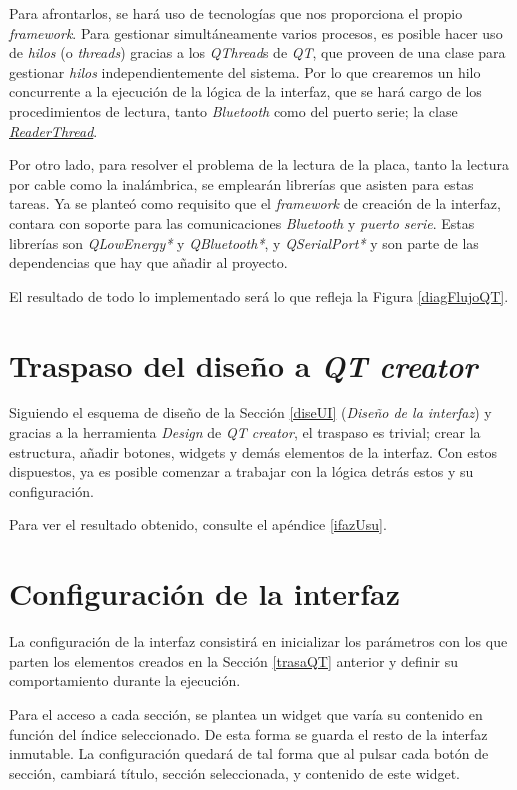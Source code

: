Para afrontarlos, se hará uso de tecnologías que nos proporciona el propio
\textit{framework}. Para gestionar simultáneamente varios procesos, es
posible hacer uso de \textit{hilos} (o \textit{threads}) gracias a los
\textit{QThread}s de \textit{QT}, que proveen de una clase para gestionar
\textit{hilos} independientemente del sistema. Por lo que crearemos un
hilo concurrente a la ejecución de la lógica de la interfaz, que se hará
cargo de los procedimientos de lectura, tanto \textit{Bluetooth} como del
puerto serie; la clase
\href{https://github.com/AntonioPriego/SmartPen/blob/main/SmartPenUI/readerthread.cpp}{\textit{ReaderThread}}.

Por otro lado, para resolver el problema de la lectura de la placa,
tanto la lectura por cable como la inalámbrica, se emplearán
librerías que asisten para estas tareas. Ya se planteó como requisito
que el \textit{framework} de creación de la interfaz, contara con
soporte para las comunicaciones \textit{Bluetooth} y
\textit{puerto serie}. Estas librerías son \textit{QLowEnergy*} y
\textit{QBluetooth*}, y \textit{QSerialPort*} y son parte de las dependencias
que hay que añadir al proyecto.

El resultado de todo lo implementado será lo que refleja la Figura \ref{diagFlujoQT}.

\section{Traspaso del diseño a \textit{QT creator}\label{trasaQT}}
Siguiendo el esquema de diseño de la Sección \ref{diseUI} (\textit{Diseño de la interfaz})
y gracias a la herramienta \textit{Design} de \textit{QT creator},
el traspaso es trivial; crear la estructura, añadir botones, widgets
y demás elementos de la interfaz. Con estos dispuestos, ya es posible
comenzar a trabajar con la lógica detrás estos y su configuración.

Para ver el resultado obtenido, consulte el apéndice \ref{ifazUsu}.

\section{Configuración de la interfaz}
La configuración de la interfaz consistirá en inicializar los parámetros
con los que parten los elementos creados en la Sección \ref{trasaQT} anterior
y definir su comportamiento durante la ejecución.

Para el acceso a cada sección, se plantea un widget que varía su
contenido en función del índice seleccionado.
De esta forma se guarda el resto de la interfaz inmutable.
La configuración quedará de tal forma que al pulsar cada botón de sección,
cambiará título, sección seleccionada, y contenido de este widget.


